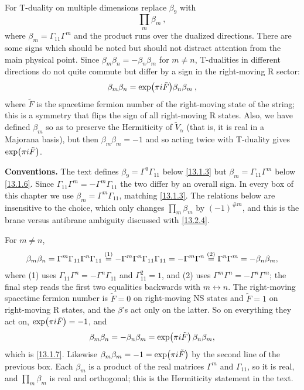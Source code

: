 For T-duality on multiple dimensions replace $\beta_9$ with
\begin{equation}
	\prod_{m}\beta_m \:, \label{13.1.6}
\end{equation}
where $\beta_m = \Gamma_{11}\Gamma^m$ and the product runs over the dualized directions. There are some signs which should be noted but should not distract attention from the main physical point. Since $\beta_m\beta_n = -\beta_n\beta_m$ for $m \neq n$, T-dualities in different directions do not quite commute but differ by a sign in the right-moving R sector:
\begin{equation}
	\beta_m\beta_n = \exp(\pi i\tilde{F})\beta_n\beta_m \:, \label{13.1.7}
\end{equation}
where $\tilde{F}$ is the spacetime fermion number of the right-moving state of the string; this is a symmetry that flips the sign of all right-moving R states. Also, we have defined $\beta_m$ so as to preserve the Hermiticity of $\tilde{V}_\alpha$ (that is, it is real in a Majorana basis), but then $\beta_m\beta_m = -1$ and so acting twice with T-duality gives $\exp(\pi i\tilde{F})$.
\begin{tcolorbox}[breakable]
	\begin{remark}
		\textbf{Conventions.} The text defines $\beta_9=\Gamma^9\Gamma_{11}$ below \eqref{13.1.3} but $\beta_m=\Gamma_{11}\Gamma^m$ below \eqref{13.1.6}. Since $\Gamma_{11}\Gamma^m=-\Gamma^m\Gamma_{11}$ the two differ by an overall sign. In every box of this chapter we use $\beta_m=\Gamma^m\Gamma_{11}$, matching \eqref{13.1.3}. The relations below are insensitive to the choice, which only changes $\prod_m\beta_m$ by $(-1)^{\#m}$, and this is the brane versus antibrane ambiguity discussed with \eqref{13.2.4}.

		For $m\neq n$,
		\begin{align*}
			\beta_m\beta_n = \Gamma^m\Gamma_{11}\Gamma^n\Gamma_{11} \overset{(1)}{=} -\Gamma^m\Gamma^n\Gamma_{11}\Gamma_{11} = -\Gamma^m\Gamma^n \overset{(2)}{=} \Gamma^n\Gamma^m = -\beta_n\beta_m ,
		\end{align*}
		where (1) uses $\Gamma_{11}\Gamma^n=-\Gamma^n\Gamma_{11}$ and $\Gamma_{11}^2=1$, and (2) uses $\Gamma^m\Gamma^n=-\Gamma^n\Gamma^m$; the final step reads the first two equalities backwards with $m\leftrightarrow n$. The right-moving spacetime fermion number is $\tilde F=0$ on right-moving NS states and $\tilde F=1$ on right-moving R states, and the $\beta$'s act only on the latter. So on everything they act on, $\exp(\pi i\tilde F)=-1$, and
		\begin{equation*}
			\beta_m\beta_n=-\beta_n\beta_m=\exp(\pi i\tilde F)\,\beta_n\beta_m ,
		\end{equation*}
		which is \eqref{13.1.7}. Likewise $\beta_m\beta_m=-1=\exp(\pi i\tilde F)$ by the second line of the previous box. Each $\beta_m$ is a product of the real matrices $\Gamma^m$ and $\Gamma_{11}$, so it is real, and $\prod_m\beta_m$ is real and orthogonal; this is the Hermiticity statement in the text.
	\end{remark}
\end{tcolorbox}


